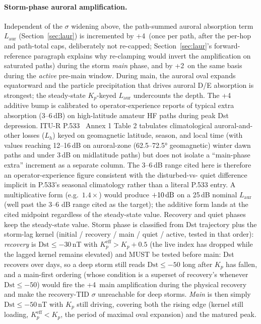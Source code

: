 \documentclass[11pt,a4paper]{article}
\newcommand{\SI}[2]{#1\,\text{#2}}
\newcommand{\dB}{\text{dB}}
\begin{document}
\paragraph{Storm-phase auroral amplification.}\label{par:laur-stormamp}  Independent of the
$\sigma$ widening above, the path-summed auroral absorption term
$L_{\text{aur}}$
(Section~\ref{sec:laur}) is incremented by \SI{+4}{\dB} (once
per path, after the per-hop and path-total caps, deliberately not
re-capped; Section~\ref{sec:laur}'s forward-reference paragraph
explains why re-clamping would invert the amplification on
saturated
paths) during the storm \emph{main} phase, and by
\SI{+2}{\dB} on the same basis during the \emph{active} pre-main
window.
During main, the auroral oval expands equatorward and the
particle precipitation that drives auroral D/E absorption is
strongest; the steady-state $K_p$-keyed $L_{\text{aur}}$
undercounts the depth.  The \SI{+4}{\dB} additive bump is
calibrated to operator-experience reports of typical
extra absorption (3--6\,dB) on high-latitude amateur HF paths
during peak Dst depression.  ITU-R P.533~\cite{itup533}
Annex 1 Table 2 tabulates climatological auroral-and-other
losses ($L_h$) keyed on geomagnetic latitude, season, and
local time (with values reaching 12--16\,dB on
auroral-zone (62.5--72.5° geomagnetic) winter dawn paths and
under 3\,dB on midlatitude paths) but does not isolate a
``main-phase extra'' increment as a separate column.  The
3--6\,dB range cited here is therefore an
operator-experience figure consistent with the disturbed-vs-
quiet difference implicit in P.533's seasonal climatology
rather than a literal P.533 entry.  A multiplicative form
(e.g.\ $1.4\times$)
would produce ${+}\SI{10}{\dB}$ on a 25\,dB nominal
$L_{\text{aur}}$ (well past the 3--6 dB range cited as the
target); the additive form lands at the cited midpoint
regardless of the steady-state value.  Recovery and
quiet phases keep the steady-state value.  Storm phase is
classified from Dst trajectory plus the storm-lag kernel
(initial / recovery / main / quiet / active, tested in that
order): \emph{recovery} is $\text{Dst} \le -30$\,nT with
$K_p^{\text{eff}} > K_p + 0.5$ (the live index has dropped while
the lagged kernel remains elevated) and MUST be tested before
main: Dst recovers over days, so a deep storm still reads
$\text{Dst} \le -50$ long after $K_p$ has fallen, and a
main-first ordering (whose condition is a superset of recovery's
whenever $\text{Dst} \le -50$) would fire the \SI{+4}{\dB} main
amplification during the physical recovery and make the
recovery-TID $\sigma$ unreachable for deep
storms.  \emph{Main} is then simply $\text{Dst} \le
-50$\,nT with $K_p$ still driving, covering both the rising edge
(kernel still loading, $K_p^{\text{eff}} < K_p$, the period
of maximal oval expansion) and the matured peak.
\end{document}
